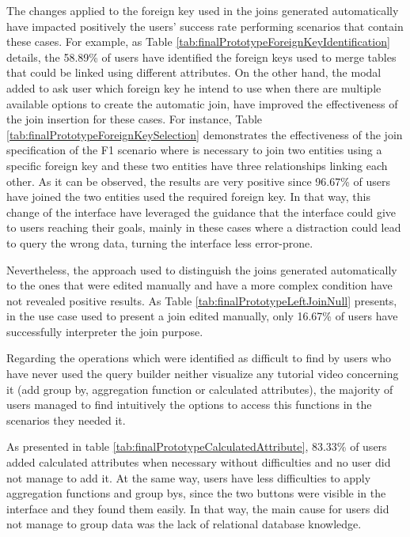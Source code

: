 The changes applied to the foreign key used in the joins generated automatically have impacted positively the users' success rate performing scenarios that contain these cases. For example, as Table \ref{tab:finalPrototypeForeignKeyIdentification} details, the 58.89\% of users have identified the foreign keys used to merge tables that could be linked using different attributes. On the other hand, the modal added to ask user which foreign key he intend to use when there are multiple available options to create the automatic join, have improved the effectiveness of the join insertion for these cases. For instance, Table \ref{tab:finalPrototypeForeignKeySelection} demonstrates the effectiveness of the join specification of the F1 scenario where is necessary to join two entities using a specific foreign key and these two entities have three relationships linking each other. As it can be observed, the results are very positive since 96.67\% of users have joined the two entities used the required foreign key. In that way, this change of the interface have leveraged the guidance that the interface could give to users reaching their goals, mainly in these cases where a distraction could lead to query the wrong data, turning the interface less error-prone.

Nevertheless, the approach used to distinguish the joins generated automatically to the ones that were edited manually and have a more complex condition have not revealed positive results. As Table \ref{tab:finalPrototypeLeftJoinNull} presents, in the use case used to present a join edited manually, only 16.67\% of users have successfully interpreter the join purpose.



Regarding the operations which were identified as difficult to find by users who have never used the query builder neither visualize any tutorial video concerning it (add group by, aggregation function or calculated attributes), the majority of users managed to find intuitively the options to access this functions in the scenarios they needed it.

As presented in table \ref{tab:finalPrototypeCalculatedAttribute}, 83.33\% of users added calculated attributes when necessary without difficulties and no user did not manage to add it. At the same way, users have less difficulties to apply aggregation functions and group bys, since the two buttons were visible in the interface and they found them easily. In that way, the main cause for users did not manage to group data was the lack of relational database knowledge.


